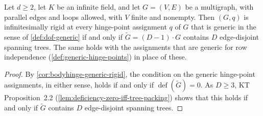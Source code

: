 \begin{corollary}
  \label{cor:bodyhinge-generic-tree-packing}
  \leanok
  Let $d \ge 2$, let $K$ be an infinite field, and let $G = (V, E)$ be
  a multigraph, with parallel edges and loops allowed, with $V$ finite
  and nonempty. Then $(G, q)$ is
  infinitesimally rigid at every hinge-point assignment $q$ of $G$ that
  is generic in the sense of \cref{def:dof-generic} if and only if
  $\tilde G = (D-1) \cdot G$ contains $D$ edge-disjoint spanning trees.
  The same holds with the assignments that are generic for row
  independence (\cref{def:generic-hinge-points}) in place of these.
\end{corollary}
\begin{proof}
  \leanok
  By \cref{cor:bodyhinge-generic-rigid}, the condition on the generic
  hinge-point assignments, in either sense, holds if and only if
  $\operatorname{def}(\tilde G) = 0$. As $D \ge 3$, KT
  Proposition~2.2 (\cref{lem:deficiency-zero-iff-tree-packing}) shows
  that this holds if and only if $\tilde G$ contains $D$ edge-disjoint
  spanning trees.
\end{proof}

